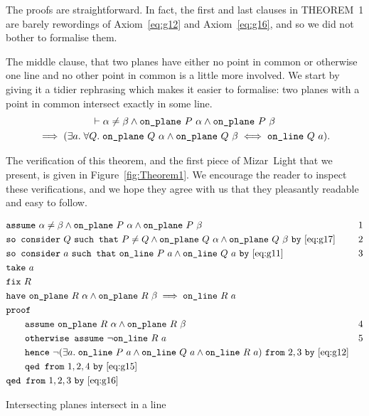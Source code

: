 The proofs are straightforward. In fact, the first and last clauses in THEOREM~1 are barely rewordings of Axiom~\ref{eq:g12} and Axiom~\ref{eq:g16}, and so we did not bother to formalise them.

The middle clause, that two planes have either no point in common or otherwise one line and no other point in common is a little more involved. We start by giving it a tidier rephrasing which makes it easier to formalise: two planes with a point in common intersect exactly in some line.
\begin{multline*}
  \vdash \alpha \neq \beta \wedge \texttt{on\_plane}\ P\ \alpha \wedge \texttt{on\_plane}\ P\ \beta\\
  \implies (\exists a.\; \forall Q.\; \texttt{on\_plane}\ Q\ \alpha \wedge \texttt{on\_plane}\ Q\ \beta \iff \texttt{on\_line}\ Q\ a).
\end{multline*}

The verification of this theorem, and the first piece of Mizar~Light that we present, is given in Figure~\ref{fig:Theorem1}. We encourage the reader to inspect these verifications, and we hope they agree with us that they pleasantly readable and easy to follow. 

\begin{boxedfigure}
\small
  \begin{align*}
    &\code{assume}\ \alpha\neq\beta \wedge \code{on\_plane}\ P\ \alpha\wedge\code{on\_plane}\ P\ \beta & 1\\
    &\code{so consider}\ Q\ \code{such that}\ P\neq Q \wedge\code{on\_plane}\ Q\ \alpha \wedge\code{on\_plane}\ Q\ \beta\ \code{by}\ \eqref{eq:g17} & 2\\
    &\code{so consider}\ a\ \code{such that}\ \code{on\_line}\ P\ a\wedge\code{on\_line}\ Q\ a\ \code{by}\ \eqref{eq:g11} & 3\\
    &\code{take}\ a\\
    &\code{fix}\ R\\
    &\code{have}\ \code{on\_plane}\ R\ \alpha\wedge\code{on\_plane}\ R\ \beta \implies \code{on\_line}\ R\ a\\
    &\code{proof}\\
    &\qquad\code{assume}\ \code{on\_plane}\ R\ \alpha\wedge\code{on\_plane}\ R\ \beta & 4\\
    &\qquad\code{otherwise assume}\ \neg\code{on\_line}\ R\ a & 5\\
    &\qquad\code{hence}\ \Triangle{a}{P}{Q}{R}\ \code{from}\ 2,3\ \code{by}\ \eqref{eq:g12}\\
    &\qquad\code{qed from}\ 1,2,4\ \code{by}\ \eqref{eq:g15}\\
    &\code{qed from}\ 1,2,3\ \code{by}\ \eqref{eq:g16}
  \end{align*}
  \caption{Intersecting planes intersect in a line}
  \label{fig:Theorem1}
\end{boxedfigure}

